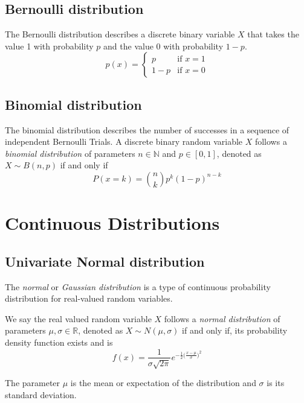 \subsection{Bernoulli distribution}

The Bernoulli distribution describes a discrete binary variable \(X\) that takes
the value 1 with probability \(p\) and the value 0 with probability \(1-p\).
\[
  p(x) =
\left\{
  \begin{array}{ll}
    p  & \mbox{if } x = 1 \\
    1-p & \mbox{if } x = 0
  \end{array}
\right.
\]


\subsection{Binomial distribution}

The binomial distribution describes the number of successes in a sequence of
independent Bernoulli Trials. A discrete binary random variable \(X\) follows a
\emph{binomial distribution} of parameters \(n \in \mathbb{N}\) and \(p \in
[0,1]\), denoted as \(X \sim B(n, p)\) if and only if
\[
  P(x = k) = \binom{n}{k}p^k(1-p)^{n-k}
\]


\section{Continuous Distributions}

\subsection{Univariate Normal distribution}

The \emph{normal} or \emph{Gaussian distribution} is a type of continuous
probability distribution for real-valued random variables.

\begin{definition}
  We say the real valued random variable \(X\) follows a \emph{normal distribution} of
  parameters \(\mu, \sigma \in \mathbb{R}\), denoted as \(X \sim N(\mu,
  \sigma)\) if and only if, its probability density function exists and is
  \[
    f(x) = \frac{1}{\sigma \sqrt{2\pi}} e^{-\frac{1}{2}\big(\frac{x-\mu}{\sigma} \big)^2}
  \]

  The parameter \(\mu\) is the mean or expectation of the distribution and
  \(\sigma\) is its standard deviation.

\end{definition}

